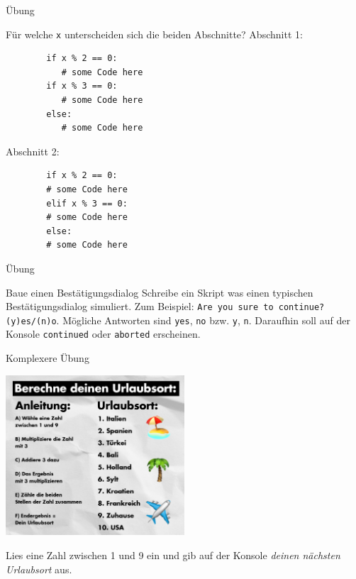 \documentclass[algorithm,pgfplots,colortheme=dark]{cuzbeamer}
\newcommand{\pybw}[1]{\texttt{#1}}
\begin{document}
\begin{fragile}{Übung}
	\begin{block}{Für welche \pybw{x} unterscheiden sich die beiden Abschnitte?}
		\vspace{5pt}
		Abschnitt 1: 
		\begin{verbatim}
		if x % 2 == 0: 
		   # some Code here
		if x % 3 == 0: 
		   # some Code here
		else: 
		   # some Code here  
		\end{verbatim}
		Abschnitt 2: 
		\begin{verbatim}
		if x % 2 == 0: 
		# some Code here
		elif x % 3 == 0: 
		# some Code here
		else: 
		# some Code here  
		\end{verbatim}
	\end{block}
\end{fragile}

\begin{frame}{Übung}
\begin{block}{Baue einen Bestätigungsdialog}
\vspace{2pt}
Schreibe ein Skript was einen typischen Bestätigungsdialog simuliert. 
Zum Beispiel: \texttt{Are you sure to continue? (y)es/(n)o}. Mögliche Antworten sind \texttt{yes}, \texttt{no} bzw. \texttt{y}, \texttt{n}. 
Daraufhin soll auf der Konsole \texttt{continued} oder \texttt{aborted} erscheinen. 
\end{block}
\end{frame}

\begin{frame}{Komplexere Übung}
\begin{center}
\includegraphics[width=0.5\textwidth]{urlaubsort.png}
\end{center}
Lies eine Zahl zwischen 1 und 9 ein und gib auf der Konsole \emph{deinen nächsten Urlaubsort} aus. 
\end{frame}
\end{document}
